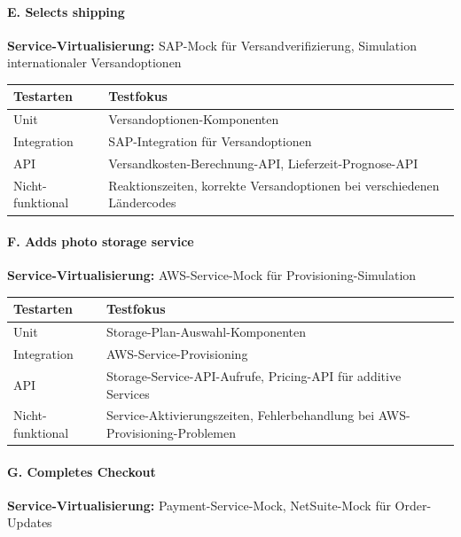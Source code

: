 \paragraph{E. Selects shipping \\}
\textbf{Service-Virtualisierung:} SAP-Mock für Versandverifizierung, Simulation internationaler Versandoptionen \\

\begin{tabular}{|p{3cm}|p{12cm}|}
\hline
\textbf{Testarten} & \textbf{Testfokus} \\
\hline
Unit & Versandoptionen-Komponenten \\
\hline
Integration & SAP-Integration für Versandoptionen \\
\hline
API & Versandkosten-Berechnung-API, Lieferzeit-Prognose-API \\
\hline
Nicht-funktional & Reaktionszeiten, korrekte Versandoptionen bei verschiedenen Ländercodes \\
\hline
\end{tabular}

\paragraph{F. Adds photo storage service\\}
\textbf{Service-Virtualisierung:} AWS-Service-Mock für Provisioning-Simulation \\
\begin{tabular}{|p{3cm}|p{12cm}|}
\hline
\textbf{Testarten} & \textbf{Testfokus} \\
\hline
Unit & Storage-Plan-Auswahl-Komponenten \\
\hline
Integration & AWS-Service-Provisioning \\
\hline
API & Storage-Service-API-Aufrufe, Pricing-API für additive Services \\
\hline
Nicht-funktional & Service-Aktivierungszeiten, Fehlerbehandlung bei AWS-Provisioning-Problemen \\
\hline
\end{tabular}


\paragraph{G. Completes Checkout\\}
\textbf{Service-Virtualisierung:} Payment-Service-Mock, NetSuite-Mock für Order-Updates \\

